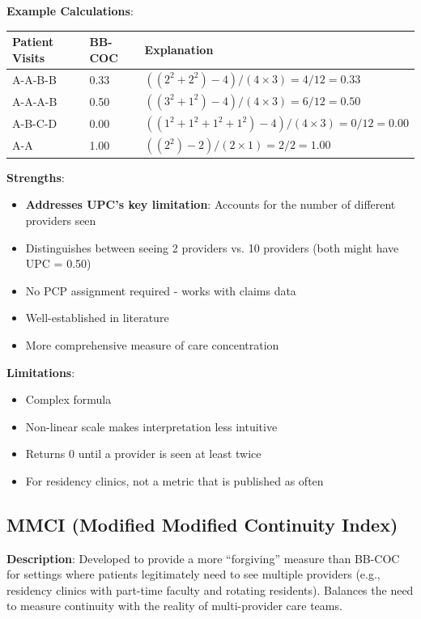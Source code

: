 \documentclass[11pt,a4paper]{article}
\begin{document}
\textbf{Example Calculations}:
\begin{table}[h]
\centering
\begin{tabular}{lll}
\toprule
Patient Visits & BB-COC & Explanation \\
\midrule
A-A-B-B & 0.33 & $((2^2+2^2)-4)/(4 \times 3) = 4/12 = 0.33$ \\
A-A-A-B & 0.50 & $((3^2+1^2)-4)/(4 \times 3) = 6/12 = 0.50$ \\
A-B-C-D & 0.00 & $((1^2+1^2+1^2+1^2)-4)/(4 \times 3) = 0/12 = 0.00$ \\
A-A & 1.00 & $((2^2)-2)/(2 \times 1) = 2/2 = 1.00$ \\
\bottomrule
\end{tabular}
\end{table}

\textbf{Strengths}:
\begin{itemize}
\item \textbf{Addresses UPC's key limitation}: Accounts for the number of different providers seen
\item Distinguishes between seeing 2 providers vs. 10 providers (both might have UPC = 0.50)
\item No PCP assignment required - works with claims data
\item Well-established in literature
\item More comprehensive measure of care concentration
\end{itemize}

\textbf{Limitations}:
\begin{itemize}
\item Complex formula 
\item Non-linear scale makes interpretation less intuitive
\item Returns 0 until a provider is seen at least twice
\item For residency clinics, not a metric that is published as often
\end{itemize}

\subsection{MMCI (Modified Modified Continuity Index)}

\textbf{Description}: Developed to provide a more ``forgiving'' measure than BB-COC for settings where patients legitimately need to see multiple providers (e.g., residency clinics with part-time faculty and rotating residents). Balances the need to measure continuity with the reality of multi-provider care teams.
\end{document}
